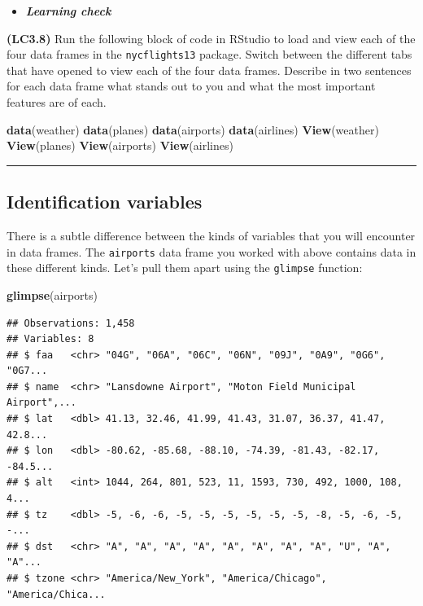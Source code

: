 \documentclass[]{tufte-book}
\newenvironment{Shaded}{\begin{snugshade}}{\end{snugshade}}
\newcommand{\KeywordTok}[1]{\textcolor[rgb]{0.13,0.29,0.53}{\textbf{{#1}}}}
\newcommand{\NormalTok}[1]{{#1}}
\let\oldrule=\rule
\renewcommand{\rule}[1]{\oldrule{\linewidth}}
\newenvironment{rmdblock}[1]
  {\begin{shaded*}
  \begin{itemize}
  \renewcommand{\labelitemi}{
    \raisebox{-.7\height}[0pt][0pt]{
    }
  }
  \item
  }
  {
  \end{itemize}
  \end{shaded*}
  }
\newenvironment{learncheck}
  {\begin{rmdblock}{warning}}
  {\end{rmdblock}}
\begin{document}
\begin{learncheck}
\textbf{\emph{Learning check}}
\end{learncheck}

\textbf{(LC3.8)} Run the following block of code in RStudio to load and
view each of the four data frames in the \texttt{nycflights13} package.
Switch between the different tabs that have opened to view each of the
four data frames. Describe in two sentences for each data frame what
stands out to you and what the most important features are of each.

\begin{Shaded}
\begin{Highlighting}[]
\KeywordTok{data}\NormalTok{(weather)}
\KeywordTok{data}\NormalTok{(planes)}
\KeywordTok{data}\NormalTok{(airports)}
\KeywordTok{data}\NormalTok{(airlines)}
\KeywordTok{View}\NormalTok{(weather)}
\KeywordTok{View}\NormalTok{(planes)}
\KeywordTok{View}\NormalTok{(airports)}
\KeywordTok{View}\NormalTok{(airlines)}
\end{Highlighting}
\end{Shaded}

\begin{center}\rule{0.5\linewidth}{\linethickness}\end{center}

\subsection{Identification variables}\label{identification-variables}

There is a subtle difference between the kinds of variables that you
will encounter in data frames. The \texttt{airports} data frame you
worked with above contains data in these different kinds. Let's pull
them apart using the \texttt{glimpse} function:

\begin{Shaded}
\begin{Highlighting}[]
\KeywordTok{glimpse}\NormalTok{(airports)}
\end{Highlighting}
\end{Shaded}

\begin{verbatim}
## Observations: 1,458
## Variables: 8
## $ faa   <chr> "04G", "06A", "06C", "06N", "09J", "0A9", "0G6", "0G7...
## $ name  <chr> "Lansdowne Airport", "Moton Field Municipal Airport",...
## $ lat   <dbl> 41.13, 32.46, 41.99, 41.43, 31.07, 36.37, 41.47, 42.8...
## $ lon   <dbl> -80.62, -85.68, -88.10, -74.39, -81.43, -82.17, -84.5...
## $ alt   <int> 1044, 264, 801, 523, 11, 1593, 730, 492, 1000, 108, 4...
## $ tz    <dbl> -5, -6, -6, -5, -5, -5, -5, -5, -5, -8, -5, -6, -5, -...
## $ dst   <chr> "A", "A", "A", "A", "A", "A", "A", "A", "U", "A", "A"...
## $ tzone <chr> "America/New_York", "America/Chicago", "America/Chica...
\end{verbatim}
\end{document}
